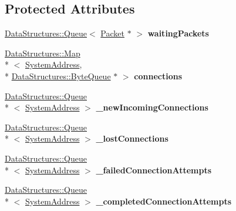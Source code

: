 \subsection*{Protected Attributes}
\begin{DoxyCompactItemize}
\item 
\hypertarget{class_rak_net_1_1_packetized_t_c_p_a418bce9fdc0508507c0db407ca3c256f}{\hyperlink{class_data_structures_1_1_queue}{Data\-Structures\-::\-Queue}$<$ \hyperlink{struct_rak_net_1_1_packet}{Packet} $\ast$ $>$ {\bfseries waiting\-Packets}}\label{class_rak_net_1_1_packetized_t_c_p_a418bce9fdc0508507c0db407ca3c256f}

\item 
\hypertarget{class_rak_net_1_1_packetized_t_c_p_a2dc67b24fc44ef9a38e3c7686315ffb2}{\hyperlink{class_data_structures_1_1_map}{Data\-Structures\-::\-Map}\\*
$<$ \hyperlink{struct_rak_net_1_1_system_address}{System\-Address}, \\*
\hyperlink{class_data_structures_1_1_byte_queue}{Data\-Structures\-::\-Byte\-Queue} $\ast$ $>$ {\bfseries connections}}\label{class_rak_net_1_1_packetized_t_c_p_a2dc67b24fc44ef9a38e3c7686315ffb2}

\item 
\hypertarget{class_rak_net_1_1_packetized_t_c_p_a1dcdd2d6de202511b848ffb363de5c3f}{\hyperlink{class_data_structures_1_1_queue}{Data\-Structures\-::\-Queue}\\*
$<$ \hyperlink{struct_rak_net_1_1_system_address}{System\-Address} $>$ {\bfseries \-\_\-new\-Incoming\-Connections}}\label{class_rak_net_1_1_packetized_t_c_p_a1dcdd2d6de202511b848ffb363de5c3f}

\item 
\hypertarget{class_rak_net_1_1_packetized_t_c_p_a9079c7699326e0d25557f72c56a2827a}{\hyperlink{class_data_structures_1_1_queue}{Data\-Structures\-::\-Queue}\\*
$<$ \hyperlink{struct_rak_net_1_1_system_address}{System\-Address} $>$ {\bfseries \-\_\-lost\-Connections}}\label{class_rak_net_1_1_packetized_t_c_p_a9079c7699326e0d25557f72c56a2827a}

\item 
\hypertarget{class_rak_net_1_1_packetized_t_c_p_af4222a3058ba299eb51cd4eca3922a51}{\hyperlink{class_data_structures_1_1_queue}{Data\-Structures\-::\-Queue}\\*
$<$ \hyperlink{struct_rak_net_1_1_system_address}{System\-Address} $>$ {\bfseries \-\_\-failed\-Connection\-Attempts}}\label{class_rak_net_1_1_packetized_t_c_p_af4222a3058ba299eb51cd4eca3922a51}

\item 
\hypertarget{class_rak_net_1_1_packetized_t_c_p_a02db79e84f5e25dbda08af350cc9d9ab}{\hyperlink{class_data_structures_1_1_queue}{Data\-Structures\-::\-Queue}\\*
$<$ \hyperlink{struct_rak_net_1_1_system_address}{System\-Address} $>$ {\bfseries \-\_\-completed\-Connection\-Attempts}}\label{class_rak_net_1_1_packetized_t_c_p_a02db79e84f5e25dbda08af350cc9d9ab}

\end{DoxyCompactItemize}


